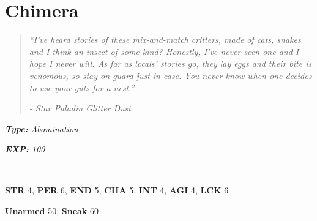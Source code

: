 \documentclass[11pt,a4paper,twocolumn]{book}
\begin{document}
	\clearpage
	
	\section*{Chimera}
	\begin{verse}
		\emph{``I've heard stories of these mix-and-match critters, made of cats, snakes and I think an insect of some kind? Honestly, I've never seen one and I hope I never will. As far as locals' stories go, they lay eggs and their bite is venomous, so stay on guard just in case. You never know when one decides to use your guts for a nest.''}
		
		\emph{-	Star Paladin Glitter Dust}
	\end{verse}
	
	\noindent
	\emph{\textbf{Type:} Abomination}
	
	\noindent
	\emph{\textbf{EXP:} 100}
	
%		
%	
%		

		--------------------------------------

\noindent
\textbf{STR} 4, \textbf{PER} 6, \textbf{END} 5, \textbf{CHA} 5, \textbf{INT} 4, \textbf{AGI} 4, \textbf{LCK} 6

\noindent
\textbf{Unarmed} 50, \textbf{Sneak} 60
\end{document}
